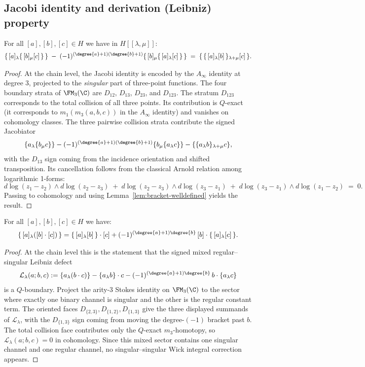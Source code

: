 \subsection{Jacobi identity and derivation (Leibniz) property}
\begin{theorem}%
For all $[a],[b],[c]\in H$ we have in $H[\![\lambda,\mu]\!]$:
\[
\{\, [a] {}_\lambda \{\, [b] {}_\mu [c] \,\} \,\} \;-\; (-1)^{(\degree{a}+1)(\degree{b}+1)} \{\, [b] {}_\mu \{\, [a] {}_\lambda [c] \,\} \,\} \;=\; \{\, \{\, [a] {}_\lambda [b] \,\} {}_{\lambda+\mu} [c] \,\}.
\]
\end{theorem}
\begin{proof}
At the chain level, the Jacobi identity is encoded by the $A_\infty$ identity at degree $3$, projected to the \emph{singular} part of three-point functions. The four boundary strata of $\FM_3(\C)$ are $D_{12}$, $D_{13}$, $D_{23}$, and $D_{123}$. The stratum $D_{123}$ corresponds to the total collision of all three points. Its contribution is $Q$-exact (it corresponds to $m_1(m_3(a,b,c))$ in the $A_\infty$ identity) and vanishes on cohomology classes. The three pairwise collision strata contribute the signed Jacobiator
\[
\{a_\lambda\{b_\mu c\}\}
-
(-1)^{(\degree{a}+1)(\degree{b}+1)}
\{b_\mu\{a_\lambda c\}\}
-
\{\{a_\lambda b\}_{\lambda+\mu}c\},
\]
with the \(D_{13}\) sign coming from the incidence orientation and shifted transposition. Its cancellation follows from the classical Arnold relation among logarithmic 1-forms:
\[
 d\log(z_1-z_2) \wedge d\log(z_2-z_3) \;+\; d\log(z_2-z_3) \wedge d\log(z_3-z_1) \;+\; d\log(z_3-z_1) \wedge d\log(z_1-z_2) \;=\; 0.
\]
Passing to cohomology and using Lemma~\ref{lem:bracket-welldefined} yields the result.
\end{proof}
\begin{theorem}%
For all $[a],[b],[c]\in H$ we have:
\[
\{\, [a] {}_\lambda ([b]\cdot [c]) \,\} = \{\, [a] {}_\lambda [b] \,\}\cdot [c] + (-1)^{(\degree{a}+1)\degree{b}} \,[b]\cdot \{\, [a] {}_\lambda [c] \,\}.
\]
\end{theorem}
\begin{proof}
At the chain level this is the statement that the signed mixed
regular--singular Leibniz defect
\[
\mathcal L_\lambda(a;b,c)
:=
\{a{}_\lambda(b\cdot c)\}
-
\{a{}_\lambda b\}\cdot c
-
(-1)^{(\degree{a}+1)\degree{b}}\,
b\cdot\{a{}_\lambda c\}
\]
is a \(Q\)-boundary.  Project the arity-\(3\) Stokes identity on
\(\FM_3(\C)\) to the sector where exactly one binary channel is
singular and the other is the regular constant term.  The oriented
faces \(D_{\{2,3\}},D_{\{1,2\}},D_{\{1,3\}}\) give the three displayed
summands of \(\mathcal L_\lambda\), with the \(D_{\{1,3\}}\) sign
coming from moving the degree-\((-1)\) bracket past \(b\).  The total
collision face contributes only the \(Q\)-exact \(m_3\)-homotopy, so
\(\mathcal L_\lambda(a;b,c)=0\) in cohomology.  Since this mixed
sector contains one singular channel and one regular channel, no
singular--singular Wick integral correction appears.
\end{proof}

